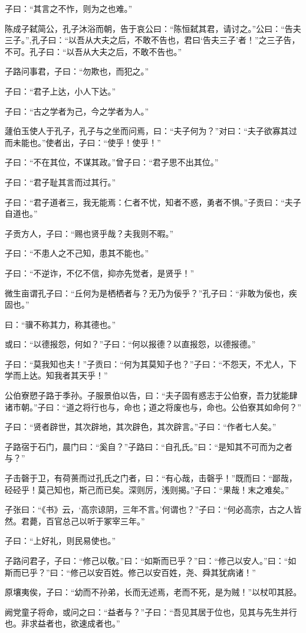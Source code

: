 \documentclass[12pt,a4paper]{ctexbook}
\begin{document}
子曰：“其言之不怍，则为之也难。”\par
陈成子弑简公，孔子沐浴而朝，告于哀公曰：“陈恒弑其君，请讨之。”公曰：“告夫三子。”,孔子曰：“以吾从大夫之后，不敢不告也，君曰‘告夫三子’者！”之三子告，不可。孔子曰：“以吾从大夫之后，不敢不告也。”\par
子路问事君，子曰：“勿欺也，而犯之。”\par
子曰：“君子上达，小人下达。”\par
子曰：“古之学者为己，今之学者为人。”\par
蘧伯玉使人于孔子，孔子与之坐而问焉，曰：“夫子何为？”对曰：“夫子欲寡其过而未能也。”使者出，子曰：“使乎！使乎！”\par
子曰：“不在其位，不谋其政。”曾子曰：“君子思不出其位。”\par
子曰：“君子耻其言而过其行。”\par
子曰：“君子道者三，我无能焉：仁者不忧，知者不惑，勇者不惧。”子贡曰：“夫子自道也。”\par
子贡方人，子曰：“赐也贤乎哉？夫我则不暇。”\par
子曰：“不患人之不己知，患其不能也。”\par
子曰：“不逆诈，不亿不信，抑亦先觉者，是贤乎！”\par
微生亩谓孔子曰：“丘何为是栖栖者与？无乃为佞乎？”孔子曰：“非敢为佞也，疾固也。”\par
曰：“骥不称其力，称其德也。”\par
或曰：“以德报怨，何如？”子曰：“何以报德？以直报怨，以德报德。”\par
子曰：“莫我知也夫！”子贡曰：“何为其莫知子也？”子曰：“不怨天，不尤人，下学而上达。知我者其天乎！”\par
公伯寮愬子路于季孙。子服景伯以告，曰：“夫子固有惑志于公伯寮，吾力犹能肆诸市朝。”子曰：“道之将行也与，命也；道之将废也与，命也。公伯寮其如命何？”\par
子曰：“贤者辟世，其次辟地，其次辟色，其次辟言。”子曰：“作者七人矣。”\par
子路宿于石门，晨门曰：“奚自？”子路曰：“自孔氏。”曰：“是知其不可而为之者与？”\par
子击磬于卫，有荷蒉而过孔氏之门者，曰：“有心哉，击磬乎！”既而曰：“鄙哉，硁硁乎！莫己知也，斯己而已矣。深则厉，浅则揭。”子曰：“果哉！末之难矣。”\par
子张曰：“《书》云，‘高宗谅阴，三年不言。’何谓也？”子曰：“何必高宗，古之人皆然。君薨，百官总己以听于冢宰三年。”\par
子曰：“上好礼，则民易使也。”\par
子路问君子，子曰：“修己以敬。”曰：“如斯而已乎？”曰：“修己以安人。”曰：“如斯而已乎？”曰：“修己以安百姓。修己以安百姓，尧、舜其犹病诸！”\par
原壤夷俟，子曰：“幼而不孙弟，长而无述焉，老而不死，是为贼！”以杖叩其胫。\par
阙党童子将命，或问之曰：“益者与？”子曰：“吾见其居于位也，见其与先生并行也。非求益者也，欲速成者也。”\par
\end{document}

